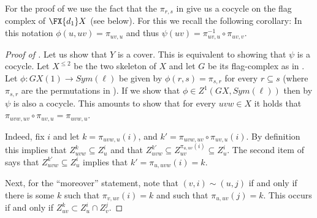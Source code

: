 For the proof of  we use the fact that the \(\pi_{r,s}\) in  give us a cocycle on the flag complex of \(\FX{d_1}X\) (see below). For this we recall the following corollary: 
In this notation \(\phi(u,uv)=\pi_{uv,u}\) and thus \(\psi(uv)=\pi_{uv,u}^{-1}\circ \pi_{uv,v}\).


\begin{proof}[Proof of ]
    Let us show that \(Y\) is a cover. This is equivalent to showing that \(\psi\) is a cocycle. Let \(X^{\leq 2}\) be the two skeleton of \(X\) and let \(G\) be its flag-complex as in . Let \(\phi:GX(1) \to Sym(\ell)\) be given by \(\phi(r,s)= \pi_{s,r}\) for every \(r \subseteq s\) (where \(\pi_{s,r}\) are the permutations in ). If we show that \(\phi \in Z^1(GX,Sym(\ell))\) then by  \(\psi\) is also a cocycle. This amounts to show that for every \(uvw \in X\) it holds that \(\pi_{uvw,uv}\circ \pi_{uv,u} = \pi_{uvw,u}\).

    Indeed, fix \(i\) and let \(k=\pi_{uvw,u}(i)\), and \(k'= \pi_{uvw,uv}\circ \pi_{uv,u}(i)\). By definition this implies that \(Z_{uvw}^k \subseteq Z_u^i\) and that \(Z_{uvw}^{k'} \subseteq Z_{uv}^{\pi_{u,uv}(i)} \subseteq Z_u^i\). The second item of  says that \(Z_{uvw}^{k'} \subseteq Z_u^i\) implies that  \(k' = \pi_{u,uvw}(i) = k\). 
    
    Next, for the ``moreover'' statement, note that \((v,i) \sim (u,j)\) if and only if there is some \(k\) such that \(\pi_{v,uv}(i)=k\) and such that \(\pi_{u,uv}(j)=k\). This occurs if and only if \(Z_{uv}^k \subset Z_u^i \cap Z_v^j\).
\end{proof}

